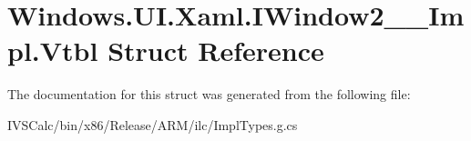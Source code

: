 \hypertarget{struct_windows_1_1_u_i_1_1_xaml_1_1_i_window2_____impl_1_1_vtbl}{}\section{Windows.\+U\+I.\+Xaml.\+I\+Window2\+\_\+\+\_\+\+Impl.\+Vtbl Struct Reference}
\label{struct_windows_1_1_u_i_1_1_xaml_1_1_i_window2_____impl_1_1_vtbl}


The documentation for this struct was generated from the following file\+:\begin{DoxyCompactItemize}
\item 
I\+V\+S\+Calc/bin/x86/\+Release/\+A\+R\+M/ilc/Impl\+Types.\+g.\+cs\end{DoxyCompactItemize}
